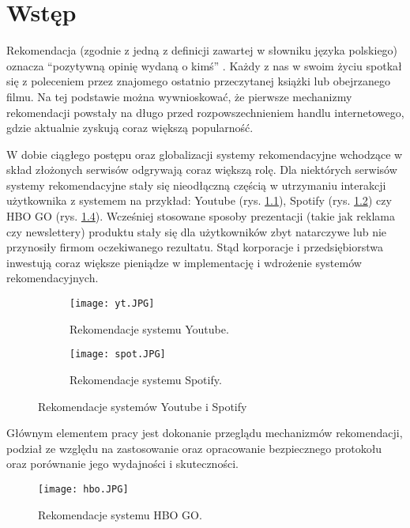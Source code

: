 \chapter{Wstęp}

Rekomendacja (zgodnie z jedną z definicji zawartej w słowniku języka polskiego) oznacza “pozytywną opinię wydaną o kimś” \cite{pwn}. Każdy z nas w swoim życiu spotkał się z poleceniem przez znajomego ostatnio przeczytanej książki lub obejrzanego filmu. Na tej podstawie można wywnioskować, że pierwsze mechanizmy rekomendacji powstały na długo przed rozpowszechnieniem handlu internetowego, gdzie aktualnie zyskują coraz większą popularność.

W dobie ciągłego postępu oraz globalizacji systemy rekomendacyjne wchodzące w skład złożonych serwisów odgrywają coraz większą rolę. Dla niektórych serwisów systemy rekomendacyjne stały się nieodłączną częścią w utrzymaniu interakcji użytkownika z systemem na przykład: Youtube (rys. \ref{fig:yt}), Spotify (rys. \ref{fig:spotify}) czy HBO GO (rys. \ref{fig:hbo}). Wcześniej stosowane sposoby prezentacji (takie jak reklama czy newslettery) produktu stały się dla użytkowników zbyt natarczywe lub nie przynosiły firmom oczekiwanego rezultatu. Stąd korporacje i przedsiębiorstwa inwestują coraz większe pieniądze w implementację i wdrożenie systemów rekomendacyjnych.

\begin{figure}
\centering
\begin{subfigure}{.5\textwidth}
  \centering
    \texttt{[image: yt.JPG]}
    \caption{Rekomendacje systemu Youtube.}
    \label{fig:yt}
\end{subfigure}%
\begin{subfigure}{.5\textwidth}
    \centering
    \texttt{[image: spot.JPG]}
    \caption{Rekomendacje systemu Spotify.}
    \label{fig:spotify}
\end{subfigure}
\caption{Rekomendacje systemów Youtube i Spotify}
\label{fig:test}
\end{figure}

Głównym elementem pracy jest dokonanie przeglądu mechanizmów rekomendacji, podział ze względu na zastosowanie oraz opracowanie bezpiecznego protokołu oraz porównanie jego wydajności i skuteczności.

\begin{figure}
    \texttt{[image: hbo.JPG]}
    \caption{Rekomendacje systemu HBO GO.}
    \label{fig:hbo}
\end{figure}

